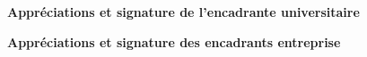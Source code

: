 \thispagestyle{empty}
\begin{center}
{\Large\bfseries Appréciations et signature de l'encadrante universitaire}\\[0.5cm]
\fbox{\begin{minipage}[t][8.5cm]{14cm}\hfill\end{minipage}}

\vspace{1cm}
{\Large\bfseries Appréciations et signature des encadrants entreprise}\\[0.5cm]
\fbox{\begin{minipage}[t][8.5cm]{14cm}\hfill\end{minipage}}
\end{center}
\clearpage

